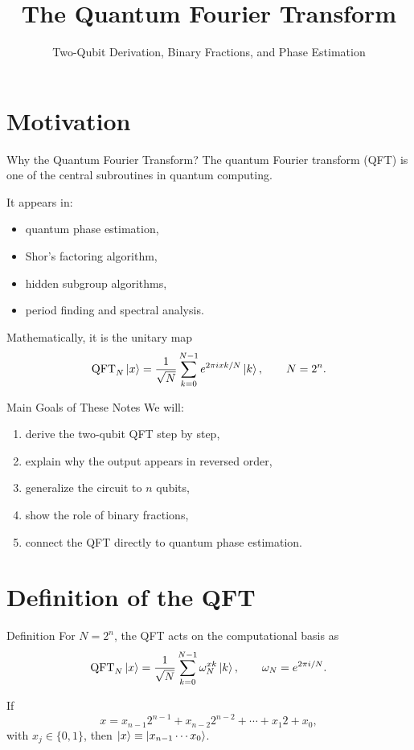 \documentclass{beamer}
\title{The Quantum Fourier Transform}
\subtitle{Two-Qubit Derivation, Binary Fractions, and Phase Estimation}
\author{}
\date{}
\begin{document}
\frame{\titlepage}

\section{Motivation}

\begin{frame}{Why the Quantum Fourier Transform?}
The quantum Fourier transform (QFT) is one of the central subroutines in quantum computing.

\medskip

It appears in:
\begin{itemize}
\item quantum phase estimation,
\item Shor's factoring algorithm,
\item hidden subgroup algorithms,
\item period finding and spectral analysis.
\end{itemize}

\medskip

Mathematically, it is the unitary map
\[
\mathrm{QFT}_N \ket{x}
=
\frac{1}{\sqrt{N}}
\sum_{k=0}^{N-1}
e^{2\pi i xk/N}\ket{k},
\qquad N=2^n.
\]
\end{frame}


\begin{frame}{Main Goals of These Notes}
We will:
\begin{enumerate}
\item derive the two-qubit QFT step by step,
\item explain why the output appears in reversed order,
\item generalize the circuit to \(n\) qubits,
\item show the role of binary fractions,
\item connect the QFT directly to quantum phase estimation.
\end{enumerate}
\end{frame}

\section{Definition of the QFT}

\begin{frame}{Definition}
For \(N=2^n\), the QFT acts on the computational basis as
\[
\mathrm{QFT}_N \ket{x}
=
\frac{1}{\sqrt{N}}
\sum_{k=0}^{N-1}
\omega_N^{xk}\ket{k},
\qquad
\omega_N=e^{2\pi i/N}.
\]

If
\[
x = x_{n-1}2^{n-1}+x_{n-2}2^{n-2}+\cdots+x_1 2 + x_0,
\]
with \(x_j\in\{0,1\}\), then \(\ket{x}\equiv \ket{x_{n-1}\cdots x_0}\).
\end{frame}
\end{document}
